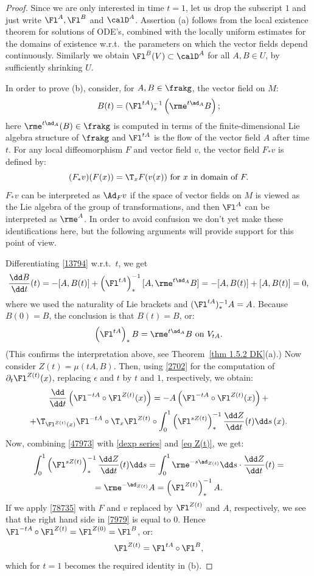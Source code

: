 \begin{proof}
    Since we are only interested in time $t=1$, let us drop the subscript $1$ and just write $\Fl^A,\Fl^B$ and $\calD^A$. Assertion (a) follows from the local existence theorem for solutions of ODE's, combined with the locally uniform estimates for the domains of existence w.r.t.\ the parameters on which the vector fields depend continuously. Similarly we obtain $\Fl^B(V)\subset \calD^A$ for all $A,B\in U$, by sufficiently shrinking $U$.

    In order to prove (b), consider, for $A,B\in\frakg$, the vector field on $M$:
    \[B(t)=(\Fl^{tA})_\ast^{-1}\left(\rme^{t\ad_A}B\right);\label{13794}\]
    here $\rme^{t\ad_A}(B)\in\frakg$ is computed in terms of the finite-dimensional Lie algebra structure of $\frakg$ and $\Fl^{tA}$ is the flow of the vector field $A$ after time $t$. For any local diffeomorphism $F$ and vector field $v$, the vector field $F_\ast v$ is defined by:
    \[(F_\ast v)(F(x))=\T_xF(v(x))\text{ for }x\text{ in domain of }F.\label{78735}\]
    $F_\ast v$ can be interpreted as $\Ad_F v$ if the space of vector fields on $M$ is viewed as the Lie algebra of the group of transformations, and then $\Fl^A$ can be interpreted as $\rme^A$. In order to avoid confusion we don't yet make these identifications here, but the following arguments will provide support for this point of view.

    Differentiating \eqref{13794} w.r.t.\ $t$, we get
    \[\frac{\dd B}{\dd t}(t)=-[A,B(t)]+\left(\Fl^{tA}\right)_\ast^{-1}[A,\rme^{t\ad_A}B]=-[A,B(t)]+[A,B(t)]=0,\]
    where we used the naturality of Lie brackets and $(\Fl^{tA})_\ast^{-1}A=A$. Because $B(0)=B$, the conclusion is that $B(t)=B$, or:
    \[\left(\Fl^{tA}\right)_\ast B=\rme^{t\ad_A}B\text{ on }V_{tA}.\label{47973}\]
    (This confirms the interpretation above, see Theorem~\ref{thm 1.5.2 DK}(a).) Now consider $Z(t)=\mu(tA,B)$. Then, using \eqref{2702} for the computation of $\partial_t \Fl^{Z(t)}(x)$, replacing $\epsilon$ and $t$ by $t$ and $1$, respectively, we obtain:
    \begin{multline}
        \frac{\dd}{\dd t}\left(\Fl^{-tA}\circ \Fl^{Z(t)}(x)\right)=-A\left(\Fl^{-tA}\circ \Fl^{Z(t)}(x)\right)+\\
        +\T_{\Fl^{Z(t)}(x)}\Fl^{-tA}\circ \T_x\Fl^{Z(t)}\circ\int_0^1 \left(\Fl^{sZ(t)}\right)_\ast^{-1}\frac{\dd Z}{\dd t}(t)\dd s\,(x).\label{7979}
    \end{multline}
    Now, combining \eqref{47973} with \eqref{dexp series} and \eqref{eq Z(t)}, we get:
    \begin{multline}
        \int_0^1\left(\Fl^{sZ(t)}\right)_\ast^{-1}\frac{\dd Z}{\dd t}(t)\dd s
        =\int_0^1 \rme^{-s\ad_{Z(t)}}\dd s \cdot \frac{\dd Z}{\dd t}(t)=\\
        =\rme^{-\ad_{Z(t)}}A=\left(\Fl^{Z(t)}\right)_\ast^{-1} A.
    \end{multline}
    If we apply \eqref{78735} with $F$ and $v$ replaced by $\Fl^{Z(t)}$ and $A$, respectively, we see that the right hand side in \eqref{7979} is equal to $0$. Hence $\Fl^{-tA}\circ \Fl^{Z(t)}=\Fl^{Z(0)}=\Fl^B$, or:
    \[\Fl^{Z(t)}=\Fl^{tA}\circ \Fl^B,\]
    which for $t=1$ becomes the required identity in (b).


\end{proof}
